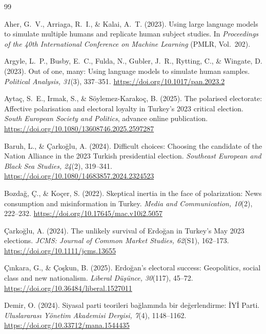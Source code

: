 \documentclass[12pt,a4paper]{report}
\begin{document}
\begin{thebibliography}{99}

Aher, G.~V., Arriaga, R.~I., \& Kalai, A.~T. (2023). Using large language models to simulate multiple humans and replicate human subject studies. In \emph{Proceedings of the 40th International Conference on Machine Learning} (PMLR, Vol.~202).

Argyle, L.~P., Busby, E.~C., Fulda, N., Gubler, J.~R., Rytting, C., \& Wingate, D. (2023). Out of one, many: Using language models to simulate human samples. \emph{Political Analysis, 31}(3), 337--351. \url{https://doi.org/10.1017/pan.2023.2}

Aytaç, S.~E., Irmak, S., \& Söylemez-Karakoç, B. (2025). The polarised electorate: Affective polarisation and electoral loyalty in Turkey's 2023 critical election. \emph{South European Society and Politics}, advance online publication. \url{https://doi.org/10.1080/13608746.2025.2597287}

Baruh, L., \& Çarkoğlu, A. (2024). Difficult choices: Choosing the candidate of the Nation Alliance in the 2023 Turkish presidential election. \emph{Southeast European and Black Sea Studies, 24}(2), 319--341. \url{https://doi.org/10.1080/14683857.2024.2324523}

Bozdağ, Ç., \& Koçer, S. (2022). Skeptical inertia in the face of polarization: News consumption and misinformation in Turkey. \emph{Media and Communication, 10}(2), 222--232. \url{https://doi.org/10.17645/mac.v10i2.5057}

Çarkoğlu, A. (2024). The unlikely survival of Erdoğan in Turkey's May 2023 elections. \emph{JCMS: Journal of Common Market Studies, 62}(S1), 162--173. \url{https://doi.org/10.1111/jcms.13655}

Çınkara, G., \& Çoşkun, B. (2025). Erdoğan's electoral success: Geopolitics, social class and new nationalism. \emph{Liberal Düşünce, 30}(117), 45--72. \url{https://doi.org/10.36484/liberal.1527011}

Demir, O. (2024). Siyasal parti teorileri bağlamında bir değerlendirme: İYİ Parti. \emph{Uluslararası Yönetim Akademisi Dergisi, 7}(4), 1148--1162. \url{https://doi.org/10.33712/mana.1544435}


\end{thebibliography}
\end{document}
